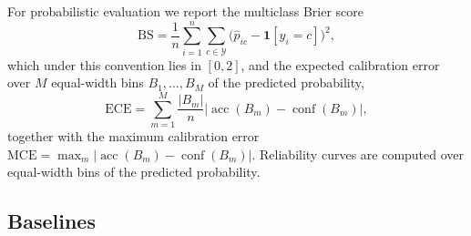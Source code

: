 For probabilistic evaluation we report the multiclass Brier score
\begin{equation}
\mathrm{BS} = \frac{1}{n}\sum_{i=1}^{n}\sum_{c \in \mathcal{Y}}
              \bigl(\hat{p}_{ic} - \mathbf{1}[y_i = c]\bigr)^2,
\label{eq:brier}
\end{equation}
which under this convention lies in $[0,2]$, and the expected calibration
error over $M$ equal-width bins $B_1,\dots,B_M$ of the predicted
probability,
\begin{equation}
\mathrm{ECE} = \sum_{m=1}^{M} \frac{|B_m|}{n}
               \bigl|\operatorname{acc}(B_m) - \operatorname{conf}(B_m)\bigr|,
\label{eq:ece}
\end{equation}
together with the maximum calibration error
$\mathrm{MCE} = \max_m |\operatorname{acc}(B_m) - \operatorname{conf}(B_m)|$.
Reliability curves are computed
over equal-width bins of the predicted probability.

\subsection{Baselines}
\label{subsec:baselines}

